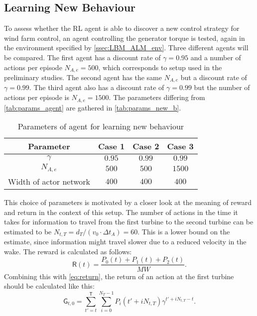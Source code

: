 \subsection{Learning New Behaviour}
To assess whether the RL agent is able to discover a new control strategy for wind farm control, an agent controlling the generator torque is tested, again in the environment specified by \autoref{ssec:LBM_ALM_env}. Three different agents will be compared. The first agent has a discount rate of $\gamma = 0.95$ and a number of actions per episode $N_{A,e} = 500$, which corresponds to setup used in the preliminary studies. The second agent has the same $N_{A,e}$ but a discount rate of $\gamma = 0.99$. The third agent also has a discount rate of $\gamma = 0.99$ but the number of actions per episode is $N_{A,e} = 1500$. The parameters differing from \autoref{tab:params_agent} are gathered in \autoref{tab:params_new_b}. \\
\begin{table}[h]
	\centering
	\caption{Parameters of agent for learning new behaviour}
	\begin{tabular}{cccc}
		\toprule 
		Parameter & Case 1 & Case 2 & Case 3 \\ 
		\midrule
		$\gamma$ & $0.95$ & $0.99$ & $0.99$ \\ 
		$N_{A,e}$ & $500$ & $500$ & $1500$ \\ 
		Width of actor network & $400$ & $400$ & $400$ \\
		\bottomrule
	\end{tabular}
	\label{tab:params_new_b}
\end{table}
This choice of parameters is motivated by a closer look at the meaning of reward and return in the context of this setup. The number of actions in the time it takes for information to travel from the first turbine to the second turbine can be estimated to be $N_{t,T} = d_T/(v_0 \cdot \Delta t_A) = 60$. This is a lower bound on the estimate, since information might travel slower due to a reduced velocity in the wake. The reward is calculated as follows: 
\begin{equation} 
\mathsf{R}(t) = \frac{P_0(t) + P_1(t) + P_2(t)}{\SI{}{MW}}.
\end{equation} Combining this with \eqref{eq:return}, the return of an action at the first turbine should be calculated like this:
\begin{equation}
	\mathsf{G}_{t,0} = \sum^\mathsf{T}_{t'=t} \sum_{i=0}^{N_T-1}P_i(t'+iN_{t,T})\gamma^{t'+iN_{t,T}-t}.
\end{equation}
